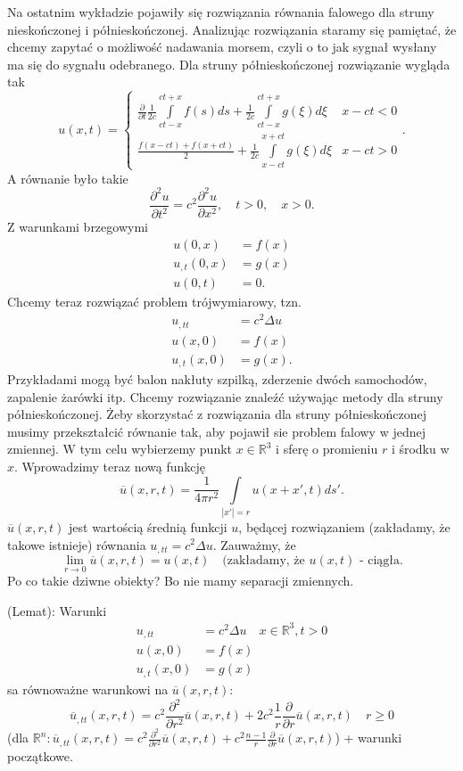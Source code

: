 \documentclass[../main.tex]{subfiles}
\begin{document}
		Na ostatnim wykładzie pojawiły się rozwiązania równania falowego dla struny nieskończonej i półnieskończonej. Analizując rozwiązania staramy się pamiętać, że chcemy zapytać o możliwość nadawania morsem, czyli o to jak sygnał wysłany ma się do sygnału odebranego. Dla struny półnieskończonej rozwiązanie wygląda tak
		\[
				u(x,t) = \begin{cases}
						\frac{\partial }{\partial t} \frac{1}{2c}\int\limits_{ct-x}^{ct+x}f(s)d s + \frac{1}{2c}\int\limits_{ct-x}^{ct+x} g(\xi)d\xi & x-ct < 0\\
						\frac{f(x-ct) + f(x+ct)}{2} + \frac{1}{2c}\int\limits_{x-ct}^{x+ct}g(\xi)d\xi &x-ct > 0
				\end{cases}
		.\]
		A równanie było takie
		\[
		\frac{\partial ^2 u}{\partial t^2} = c^2 \frac{\partial ^2 u}{\partial x^2},\quad t>0,\quad x>0
		.\]
		Z warunkami brzegowymi
		\begin{align*}
				u(0,x) &= f(x)\\
				u_{,t}(0,x) &= g(x)\\
				u(0,t) &= 0
		.\end{align*}
		Chcemy teraz rozwiązać problem trójwymiarowy, tzn.
\begin{align*}
		u_{,tt} &= c^2 \Delta u\\
		u(x,0) &= f(x)\\
		u_{,t}(x,0) &= g(x)
.\end{align*}
Przykładami mogą być balon nakłuty szpilką, zderzenie dwóch samochodów, zapalenie żarówki itp. Chcemy rozwiązanie znaleźć używając metody dla struny półnieskończonej. Żeby skorzystać z rozwiązania dla struny półnieskończonej musimy przekształcić równanie
tak, aby pojawił sie problem falowy w jednej zmiennej. W tym celu wybierzemy punkt $x\in \mathbb{R}^3$ i sferę o promieniu $r$ i środku w $x$. Wprowadzimy teraz nową funkcję
\[
		\overline{u} (x,r,t) = \frac{1}{4\pi r^2}\int\limits_{|x'| = r}u(x+x',t)d s'
.\]
$\overline{u} (x,r,t)$ jest wartością średnią funkcji $u$, będącej rozwiązaniem (zakładamy, że takowe istnieje) równania $u_{,t t} = c^2 \Delta u$. Zauważmy, że
\[
		\lim_{r \to 0}\overline{u} (x,r,t) = u(x,t) \quad\text{(zakładamy, że $u(x,t)$ - ciągła}
.\]
Po co takie dziwne obiekty? Bo nie mamy separacji zmiennych.
\begin{stw}
		(Lemat): Warunki
		\begin{align*}
				u_{,t t} &= c^2 \Delta u \quad x\in \mathbb{R}^3, t>0\\
				u(x,0) &= f(x)\\
				u_{,t}(x,0) &= g(x)
		\end{align*}
		sa równoważne warunkowi na $\overline{u} (x,r,t)$:
		\begin{equation}
				\label{eq:rownowazne}
				\overline{u}_{,t t} (x,r,t) = c^2 \frac{\partial^2}{\partial r^2} \overline{u} (x,r,t) + 2c^2 \frac{1}{r} \frac{\partial }{\partial r} \overline{u} (x,r,t)\quad r\ge 0
		\end{equation}
		(dla $\mathbb{R}^n: \overline{u} _{,t t}(x,r,t) = c^2 \frac{\partial ^2}{\partial r^2} \overline{u} (x,r,t) + c^2 \frac{n-1}{r} \frac{\partial }{\partial r} \overline{u} (x,r,t)$) + warunki początkowe. \\
\end{stw}
\end{document}
